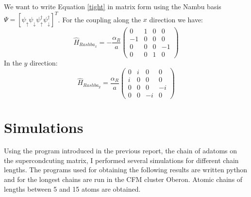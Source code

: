 \documentclass[letterpaper,12pt]{article}
\begin{document}
We want to write Equation \ref{tight} in matrix form using the Nambu basis $\Psi = [\psi_\uparrow \psi_\downarrow \psi_\uparrow^\dagger \psi_\downarrow^\dagger]^T$. For the coupling along the $x$ direction we have:
\begin{equation}
\hat{H}_{Rashba_x} = 
    -\frac{\alpha_R}{a}\begin{pmatrix}
    0 & 1 & 0 & 0 \\
    -1 & 0 & 0 & 0 \\
    0 & 0 & 0 & -1 \\
    0 & 0 & 1 & 0
  \end{pmatrix}
\end{equation}
In the $y$ direction:
\begin{equation}
\hat{H}_{Rashba_y} = 
    \frac{\alpha_R}{a}\begin{pmatrix}
    0 & i & 0 & 0 \\
    i & 0 & 0 & 0 \\
    0 & 0 & 0 & -i \\
    0 & 0 & -i & 0
  \end{pmatrix}
\end{equation}

\section{Simulations}
Using the program introduced in the previous report, the chain of adatoms on the supercondcuting matrix, I performed several simulations for different chain lengths. The programs used for obtaining the following results are written python and for the longest chains are run in the CFM cluster Oberon. Atomic chains of lengths between 5 and 15 atoms are obtained.




   
 

{}

\end{document}
